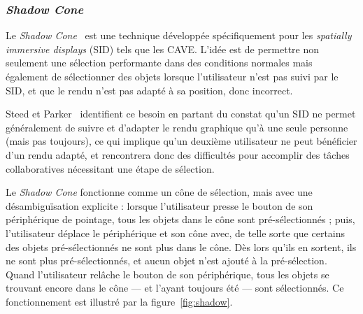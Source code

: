 	\subsubsection{\emph{Shadow Cone}}
	Le \emph{Shadow Cone}~\cite{steed20043d} est une technique développée spécifiquement pour les \emph{spatially immersive displays} (SID) tels que les CAVE. L'idée est de permettre non seulement une sélection performante dans des conditions \og normales \fg{} mais également de sélectionner des objets lorsque l'utilisateur n'est pas suivi par le SID, et que le rendu n'est pas adapté à sa position, donc incorrect.
	
	Steed et Parker~\cite{steed20043d} identifient ce besoin en partant du constat qu'un SID ne permet généralement de suivre et d'adapter le rendu graphique qu'à une seule personne (mais pas toujours\footnotemark), ce qui implique qu'un deuxième utilisateur ne peut bénéficier d'un rendu adapté, et rencontrera donc des difficultés pour accomplir des tâches collaboratives nécessitant une étape de sélection.
	
	
	Le \emph{Shadow Cone} fonctionne comme un cône de sélection, mais avec une désambiguïsation explicite : lorsque l'utilisateur presse le bouton de son périphérique de pointage, tous les objets dans le cône sont pré-sélectionnés ; puis, l'utilisateur déplace le périphérique et son cône avec, de telle sorte que certains des objets pré-sélectionnés ne sont plus dans le cône. Dès lors qu'ils en sortent, ils ne sont plus pré-sélectionnés, et aucun objet n'est ajouté à la pré-sélection. Quand l'utilisateur relâche le bouton de son périphérique, tous les objets se trouvant encore dans le cône --- et l'ayant toujours été --- sont sélectionnés. Ce fonctionnement est illustré par la figure~\ref{fig:shadow}.
	
